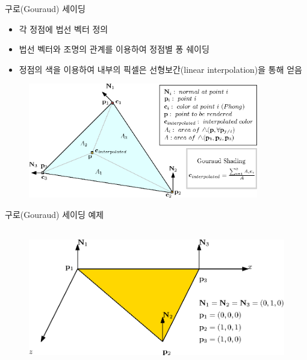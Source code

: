 \begin{frame}[fragile]{구로(Gouraud) 세이딩}

\begin{itemize}
\item 각 정점에 법선 벡터 정의
\item 법선 벡터와 조명의 관계를 이용하여 정점별 퐁 쉐이딩
\item 정점의 색을 이용하여 내부의 픽셀은 선형보간(linear interpolation)을 통해 얻음
\end{itemize}

\begin{figure}[h!]
  \centering
    \includegraphics[height=5cm]{Math_lighting/interpolatedColors.eps}
\end{figure}
\end{frame}



\begin{frame}[fragile]{구로(Gouraud) 세이딩 예제}

\begin{figure}[h!]
  \centering
    \includegraphics[height=6cm]{Math_lighting/simpleTriangle.eps}
\end{figure}

\end{frame}



